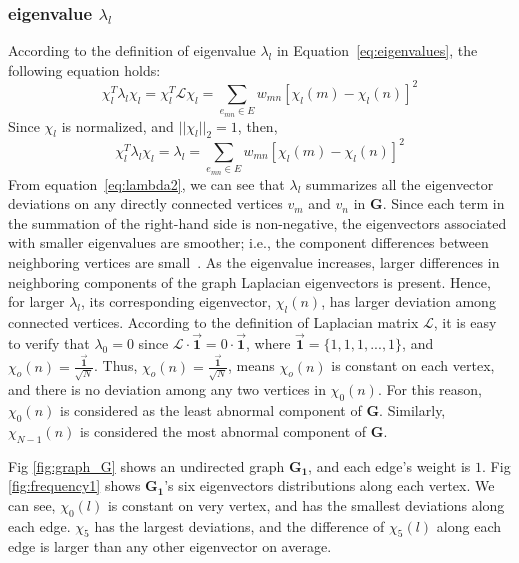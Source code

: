 \subsubsection{eigenvalue $\lambda_l$}
According to the definition of eigenvalue $\lambda_l$  in Equation~\ref{eq:eigenvalues}, the following equation holds:
\begin{equation}
\label{eq:lambda1}
\chi_{l}^T\lambda_{l}\chi_{l}=\chi_{l}^T\mathcal{L}\chi_{l}= \sum_{e_{mn}\in E} w_
{mn}[\chi_{l}(m)-\chi_{l}(n)]^2
\end{equation}Since $\chi_{l}$ is normalized, and $||\chi_{l}||_2 =1$, then,
\begin{equation}
\label{eq:lambda2}
\chi_{l}^T\lambda_{l}\chi_{l}=\lambda_l= \sum_{e_{mn}\in E} w_
{mn}[\chi_{l}(m)-\chi_{l}(n)]^2
\end{equation}
From equation~\ref{eq:lambda2}, we can see that $\lambda_l$ summarizes all the eigenvector deviations on any directly connected vertices $v_m$ and $v_n$ in $\mathbf{G}$. Since each term in the summation of the right-hand side is non-negative, the eigenvectors associated with smaller eigenvalues are smoother; i.e., the component differences between neighboring vertices are
small~\cite{shuman2015vertex}. As the eigenvalue increases, larger differences in neighboring
components of the graph Laplacian eigenvectors is present.
Hence, for larger $\lambda_l$, its corresponding eigenvector, $\chi_l(n)$, has larger deviation among connected vertices. According to the definition of Laplacian matrix $\mathcal{L}$, it is easy to verify that $\lambda_0=0$ since $\mathcal{L}\cdot\vec{\textbf{1}}= 0\cdot\vec{\textbf{1}}$, where $\vec{\textbf{1}}=\{1,1,1,...,1\}$, and $\chi_o(n)=\frac{\vec{\textbf{1}}}{\sqrt{N}}$. Thus, $\chi_o(n)=\frac{\vec{\textbf{1}}}{\sqrt{N}}$, means $\chi_o(n)$ is constant on each vertex, and there is no deviation among any two vertices in $\chi_0(n)$. For this reason, $\chi_0(n)$ is considered as the least abnormal component of $\mathbf{G}$. Similarly, $\chi_{N-1}(n)$ is considered the most abnormal component of $\mathbf{G}$.

Fig \ref{fig:graph_G} shows an undirected graph $\mathbf{G_1}$, and each edge's weight is $1$. Fig \ref{fig:frequency1} shows  $\mathbf{G_1}$'s six eigenvectors distributions along each vertex. We can see, $\chi_0(l)$ is constant on very vertex, and has the smallest deviations along each edge. $\chi_5$ has the largest deviations, and the difference of $\chi_5(l)$ along each edge is larger than any other eigenvector on average.



